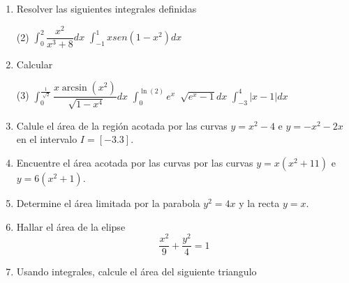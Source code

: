 \documentclass[12pt]{article}
\newenvironment{preguntas}
{\begin{enumerate}\itemsep12pt
	}
	{
	\end{enumerate}
}
\begin{document}
\begin{preguntas}
\item Resolver las siguientes integrales definidas
\begin{tasks}(2)
\task $\displaystyle\int_0^2 \dfrac{x^2}{x^3+8} dx$
\task $\displaystyle\int_{-1}^1 xsen(1-x^2)dx$
\end{tasks}
\item Calcular
\begin{tasks}(3)
\task $\displaystyle\int_0^{\frac{1}{\sqrt[]{2}}} \dfrac{x \arcsin(x^2)}{\sqrt[]{1-x^4}}dx$
\task $\displaystyle\int_0^{\ln(2)} e^x\ \sqrt[]{e^x-1}dx$
\task $\displaystyle\int_{-3}^{4} |x-1|dx$
\end{tasks}
\item Calule el área de la región acotada por las curvas $y=x^2-4$ e $y = -x^2-2x$ en el intervalo $I =  [-3.3]$.
\item Encuentre el área acotada por las curvas por las curvas $y=x(x^2+11)$ e $y=6(x^2+1)$.
\item Determine el área limitada por la parabola $y^2=4x$ y la recta $y=x$.
\item Hallar el área de la elipse
	$$\dfrac{x^2}{9} + \dfrac{y^2}{4} = 1$$
\item Usando integrales, calcule el área del siguiente triangulo
	\begin{center}
	\end{center}
\end{preguntas}
\end{document}

